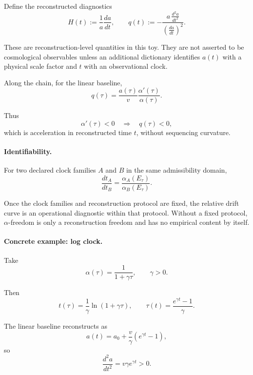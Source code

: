 \documentclass[aps,prx,onecolumn,11pt]{revtex4-2}
\theoremstyle{plain}
\theoremstyle{definition}
\theoremstyle{remark}
\begin{document}
Define the reconstructed diagnostics
\begin{equation}
H(t)
:=
\frac{1}{a}
\frac{da}{dt},
\qquad
q(t)
:=
-
\frac{
a\,\frac{d^2a}{dt^2}
}{
\left(\frac{da}{dt}\right)^2
}.
\label{eq:H_q_defs}
\end{equation}

These are reconstruction-level quantities in this toy. They are not
asserted to be cosmological observables unless an additional dictionary
identifies \(a(t)\) with a physical scale factor and \(t\) with an
observational clock.

Along the chain, for the linear baseline,
\begin{equation}
q(\tau)
=
\frac{a(\tau)}{v}
\frac{\alpha'(\tau)}{\alpha(\tau)}.
\label{eq:q_linear_tau}
\end{equation}

Thus
\[
\alpha'(\tau)<0
\quad\Longrightarrow\quad
q(\tau)<0,
\]
which is acceleration in reconstructed time \(t\), without sequencing
curvature.

\paragraph{Identifiability.}

For two declared clock families \(A\) and \(B\) in the same
admissibility domain,
\begin{equation}
\frac{dt_A}{dt_B}
=
\frac{\alpha_A(E_\tau)}{\alpha_B(E_\tau)}.
\label{eq:clock_ratio}
\end{equation}

Once the clock families and reconstruction protocol are fixed, the
relative drift curve is an operational diagnostic within that protocol.
Without a fixed protocol, \(\alpha\)-freedom is only a reconstruction
freedom and has no empirical content by itself.

\paragraph{Concrete example: log clock.}

Take
\begin{equation}
\alpha(\tau)
=
\frac{1}{1+\gamma\tau},
\qquad
\gamma>0.
\label{eq:alpha_example}
\end{equation}

Then
\[
t(\tau)
=
\frac{1}{\gamma}
\ln(1+\gamma\tau),
\qquad
\tau(t)
=
\frac{e^{\gamma t}-1}{\gamma}.
\]

The linear baseline reconstructs as
\begin{equation}
a(t)
=
a_0
+
\frac{v}{\gamma}
\left(
e^{\gamma t}-1
\right),
\label{eq:a_of_t_exponential}
\end{equation}
so
\[
\frac{d^2a}{dt^2}
=
v\gamma e^{\gamma t}
>
0.
\]
\end{document}
